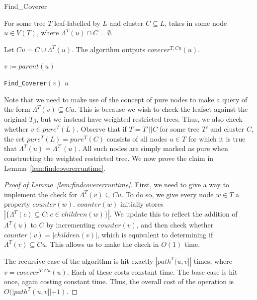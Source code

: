 \documentclass[final,1p,times]{elsarticle}
\newcommand{\leafset}{\Lambda}
\newcommand{\TB}{T_\beta}
\begin{document}
    \begin{algorithm}
        \caption{Find\_Coverer}
        \label{alg:findcoverer}

        \begin{algorithmic}[1]
            \Input For some tree $T$ leaf-labelled by $L$ and cluster $C \subseteq L$, takes in some node $u \in V(T)$, where $\leafset^{T}(u) \cap C = \emptyset$.

            \Output Let $Cu = C \cup \leafset^{T}(u)$. The algorithm outputs $coverer^{T, Cu}(u)$.

            \State $v := parent(u)$

            \If{$\leafset^{T}(v) \subseteq Cu$ and $v$ is pure}
                \State \Return \texttt{Find\_Coverer}$(v)$
            \Else
                \State \Return $u$
            \EndIf
        \end{algorithmic}
    \end{algorithm}

    Note that we need to make use of the concept of pure nodes to make a query of the form $\leafset^{T}(v) \subseteq Cu$. This is because we wish to check the leafset against the original $\TB$, but we instead have weighted restricted trees. Thus, we also check whether $v \in pure^{T}(L)$. Observe that if $T = T'||C$ for some tree $T'$ and cluster $C$, the set $pure^{T}(L) = pure^{T}(C)$ consists of all nodes $u \in T$ for which it is true that $\leafset^{T}(u) = \leafset^{T'}(u)$. All such nodes are simply marked as pure when constructing the weighted restricted tree. We now prove the claim in Lemma~\ref{lem:findcovererruntime}.

    \begin{proof}[Proof of Lemma~\ref{lem:findcovererruntime}]
        First, we need to give a way to implement the check for $\leafset^{T}(v) \subseteq Cu$. To do so, we give every node $w \in T$ a property $counter(w)$. $counter(w)$ initially stores $|\{\leafset^{T}(c) \subseteq C : c \in children(w)\}|$. We update this to reflect the addition of $\leafset^{T}(u)$ to $C$ by incrementing $counter(v)$, and then check whether $counter(v) = |children(v)|$, which is equivalent to determining if $\leafset^{T}(v) \subseteq Cu$. This allows us to make the check in $O(1)$ time.

        The recursive case of the algorithm is hit exactly $|path^{T}(u, v]|$ times, where $v = coverer^{T, Cu}(u)$. Each of these costs constant time. The base case is hit once, again costing constant time. Thus, the overall cost of the operation is $O(|path^{T}(u, v]| + 1)$.
    \end{proof}
\end{document}
